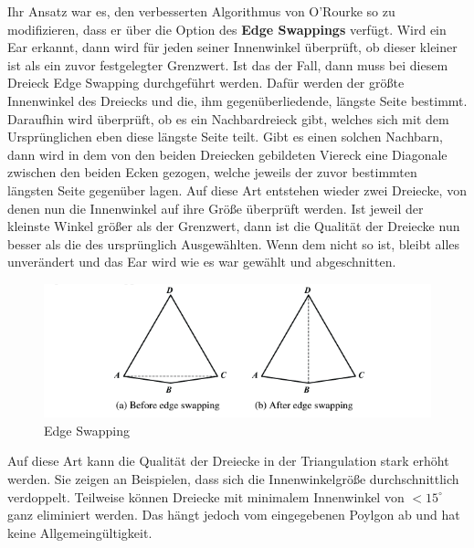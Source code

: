 Ihr Ansatz war es, den verbesserten Algorithmus von O'Rourke so zu modifizieren, dass er über die Option des \textbf{Edge Swappings} verfügt.
Wird ein Ear erkannt, dann wird für jeden seiner Innenwinkel überprüft, ob dieser kleiner ist als ein zuvor festgelegter Grenzwert. Ist das der Fall, dann 
muss bei diesem Dreieck Edge Swapping durchgeführt werden. Dafür werden der größte Innenwinkel des Dreiecks und die, ihm gegenüberliedende, längste Seite bestimmt.
Daraufhin wird überprüft, ob es ein Nachbardreieck gibt, welches sich mit dem Ursprünglichen eben diese längste Seite teilt. Gibt es einen solchen Nachbarn, 
dann wird in dem von den beiden Dreiecken gebildeten Viereck eine Diagonale zwischen den beiden Ecken gezogen, welche jeweils der zuvor bestimmten längsten Seite gegenüber lagen.
Auf diese Art entstehen wieder zwei Dreiecke, von denen nun die Innenwinkel auf ihre Größe überprüft werden. Ist jeweil der kleinste Winkel größer als der Grenzwert, 
dann ist die Qualität der Dreiecke nun besser als die des ursprünglich Ausgewählten. Wenn dem nicht so ist, bleibt alles unverändert und das Ear wird wie es war gewählt und abgeschnitten.


\begin{figure}
    \includegraphics[width=1\textwidth]{bilder/edgeswapping.png}
    \caption[Edge Swapping]{Edge Swapping \cite{earclipping}}
    \label{fig:edgeswapping}
\end{figure}

Auf diese Art kann die Qualität der Dreiecke in der Triangulation stark erhöht werden. Sie zeigen an Beispielen, dass sich die Innenwinkelgröße durchschnittlich verdoppelt.
Teilweise können Dreiecke mit minimalem Innenwinkel von $< 15^\circ$ ganz eliminiert werden. Das hängt jedoch vom eingegebenen Poylgon ab und hat keine Allgemeingültigkeit.

